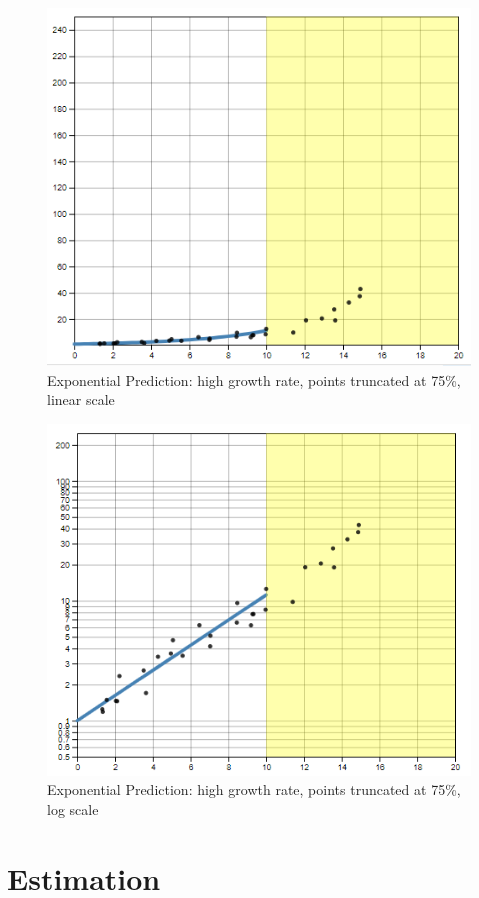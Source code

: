 \documentclass[print]{nuthesis}
\begin{document}
\begin{figure}[tbp]

{\centering \includegraphics[width=0.65\linewidth,]{images/high-15-linear} 

}

\caption{Exponential Prediction: high growth rate, points truncated at 75\%, linear scale}\label{fig:high-15-linear}
\end{figure}

\begin{figure}[tbp]

{\centering \includegraphics[width=0.65\linewidth,]{images/high-15-log} 

}

\caption{Exponential Prediction: high growth rate, points truncated at 75\%, log scale}\label{fig:high-15-log}
\end{figure}

\hypertarget{estimation-1}{%
\chapter{Estimation}\label{estimation-1}}
\end{document}
